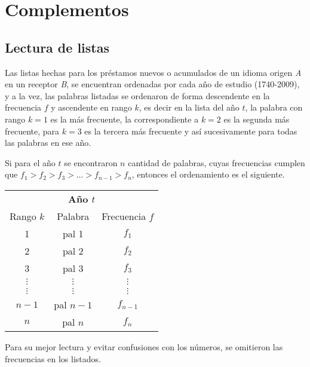\chapter{Complementos}

\section{Lectura de listas}
\label{lectura.listas}
 
Las listas hechas para los préstamos nuevos \cite{prestamos_nuevos} o acumulados \cite{prestamos_acumulados} de un idioma origen \textit{A} en un receptor \textit{B},  se encuentran ordenadas por cada año de estudio (1740-2009), y a la vez, las palabras listadas se ordenaron de forma descendente en la frecuencia $f$ y ascendente en rango $k$,  es decir en la lista del año $t$, la palabra con rango $k=1$ es la más frecuente,  la correspondiente a $k=2$ es la segunda más frecuente, para $k=3$ es la tercera más frecuente y así sucesivamente para todas las palabras en ese año. 


Si para el año $t$  se encontraron $n$ cantidad de palabras, cuyas frecuencias cumplen que $f_{1} > f_{2} > f_{3} >  \dots > f_{n-1} > f_{n}$,  entonces el ordenamiento es el siguiente. 

\begin{table}[h!]
	\centering
	\begin{tabular}{ccc}
		\multicolumn{3}{c}{\textbf{Año $t$}}        \\
		Rango $k$     & Palabra    & Frecuencia $f$    \\
		1             & pal 1      & $f_{1}$            \\
		2             & pal 2      & $f_{2}$             \\
		3             & pal 3      & $f_{3}$              \\
		$\vdots$      & $\vdots$   & $\vdots$         \\
		$\vdots$      & $\vdots$   & $\vdots$         \\
		$n-1$         & pal $n-1$  & $f_{n-1}$             \\
		$n$           & pal $n$    & $f_{n}$          
	\end{tabular}
\end{table}


Para su mejor lectura y evitar confusiones con los números,  se omitieron las frecuencias en los listados. 




